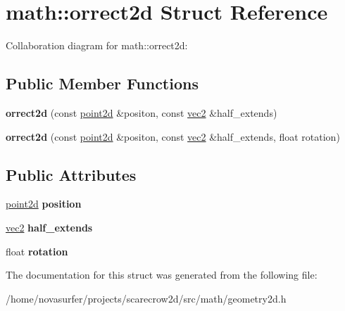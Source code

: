 \hypertarget{structmath_1_1orrect2d}{}\section{math\+:\+:orrect2d Struct Reference}
\label{structmath_1_1orrect2d}


Collaboration diagram for math\+:\+:orrect2d\+:
\subsection*{Public Member Functions}
\begin{DoxyCompactItemize}
\item 
\mbox{\label{structmath_1_1orrect2d_adbdedb710b9bfd2f91af799461325d88}} 
{\bfseries orrect2d} (const \hyperlink{structmath_1_1vec2}{point2d} \&positon, const \hyperlink{structmath_1_1vec2}{vec2} \&half\+\_\+extends)
\item 
\mbox{\label{structmath_1_1orrect2d_a01faa7444f7b11cf17c4beee87333f43}} 
{\bfseries orrect2d} (const \hyperlink{structmath_1_1vec2}{point2d} \&positon, const \hyperlink{structmath_1_1vec2}{vec2} \&half\+\_\+extends, float rotation)
\end{DoxyCompactItemize}
\subsection*{Public Attributes}
\begin{DoxyCompactItemize}
\item 
\mbox{\label{structmath_1_1orrect2d_a7c32a3ca429b96456d61772e6427f7e1}} 
\hyperlink{structmath_1_1vec2}{point2d} {\bfseries position}
\item 
\mbox{\label{structmath_1_1orrect2d_a89d9061f7f9397075f56180c30085453}} 
\hyperlink{structmath_1_1vec2}{vec2} {\bfseries half\+\_\+extends}
\item 
\mbox{\label{structmath_1_1orrect2d_a5ebadfa6b5fea4288d29e8c43dcd427e}} 
float {\bfseries rotation}
\end{DoxyCompactItemize}


The documentation for this struct was generated from the following file\+:\begin{DoxyCompactItemize}
\item 
/home/novasurfer/projects/scarecrow2d/src/math/geometry2d.\+h\end{DoxyCompactItemize}
